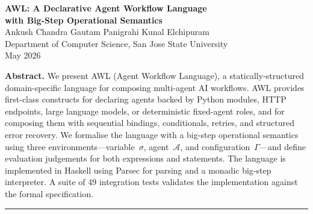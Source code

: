 \documentclass[10pt]{article}
\newcommand{\A}{\mathcal{A}}
\begin{document}
\begin{center}
  {\Large\bfseries AWL: A Declarative Agent Workflow Language\\[4pt]
   with Big-Step Operational Semantics}\\[10pt]
  {\normalsize
    Ankush Chandra \quad Gautam Panigrahi \quad Kunal Elchipuram}\\[3pt]
  {\small Department of Computer Science, San Jose State University}\\[3pt]
  {\small May 2026}
\end{center}

\begin{center}
\begin{minipage}{0.88\linewidth}
\small\textbf{Abstract.}
We present AWL (Agent Workflow Language), a statically-structured
domain-specific language for composing multi-agent AI workflows.  AWL provides
first-class constructs for declaring agents backed by Python modules, HTTP
endpoints, large language models, or deterministic fixed-agent roles, and for
composing them with sequential bindings, conditionals, retries, and structured
error recovery.  We formalise the language with a big-step operational semantics
using three environments---variable~$\sigma$, agent~$\A$, and
configuration~$\Gamma$---and define evaluation judgements for both expressions
and statements.  The language is implemented in Haskell using Parsec for
parsing and a monadic big-step interpreter.  A suite of 49 integration tests
validates the implementation against the formal specification.
\end{minipage}
\end{center}

\vspace{6pt}
\hrule
\vspace{6pt}
\end{document}
